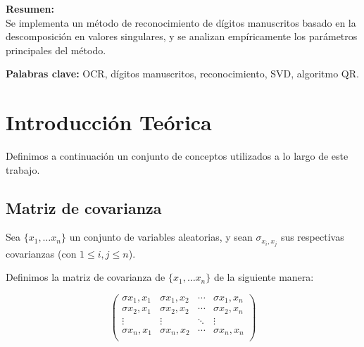 \documentclass[a4paper,10pt,twoside]{article}
\begin{document}
\vspace{3cm}

\textbf{Resumen:} \\
Se implementa un método de reconocimiento de dígitos manuscritos basado en la descomposición en valores singulares, y se analizan empíricamente los parámetros principales del método.

\textbf{Palabras clave:}
OCR, dígitos manuscritos, reconocimiento, SVD, algoritmo QR.

\newpage




\tableofcontents

\newpage




\section{Introducción Teórica}

Definimos a continuación un conjunto de conceptos utilizados a lo largo de este trabajo.


\subsection{Matriz de covarianza}

Sea $\{x_1, \ldots x_n\}$ un conjunto de variables aleatorias, y sean $\sigma_{x_i, x_j}$ sus respectivas covarianzas (con $1 \leq i, j \leq n$). 

Definimos la matriz de covarianza de $\{x_1, \ldots x_n\}$ de la siguiente manera:

$$
  \begin{pmatrix}
    \sigma x_1,x_1 & \sigma x_1,x_2 & \cdots & \sigma x_1,x_n \\
    \sigma x_2,x_1 & \sigma x_2,x_2 & \cdots & \sigma x_2,x_n \\
    \vdots  & \vdots  & \ddots & \vdots  \\
    \sigma x_n,x_1 & \sigma x_n,x_2 & \cdots & \sigma x_n,x_n \\
  \end{pmatrix}
$$
\end{document}
